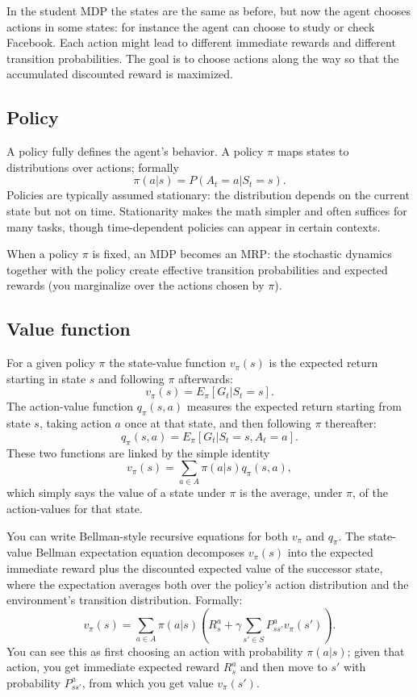 In the student MDP the states are the same as before, but now the agent chooses actions in some states: for instance the agent can choose to study or check Facebook. Each action might lead to different immediate rewards and different transition probabilities. The goal is to choose actions along the way so that the accumulated discounted reward is maximized.

\subsection{Policy}
A policy fully defines the agent’s behavior. A policy $\pi$ maps states to distributions over actions; formally
\begin{equation*}
    \pi(a|s) = P(A_t=a|S_t=s).
\end{equation*}
Policies are typically assumed stationary: the distribution depends on the current state but not on time. Stationarity makes the math simpler and often suffices for many tasks, though time-dependent policies can appear in certain contexts.

When a policy $\pi$ is fixed, an MDP becomes an MRP: the stochastic dynamics together with the policy create effective transition probabilities and expected rewards (you marginalize over the actions chosen by $\pi$).

\subsection{Value function}
For a given policy $\pi$ the state-value function $v_\pi(s)$ is the expected return starting in state $s$ and following $\pi$ afterwards:
\begin{equation*}
    v_\pi(s)=E_\pi[G_t|S_t=s].
\end{equation*}
The action-value function $q_\pi(s,a)$ measures the expected return starting from state $s$, taking action $a$ once at that state, and then following $\pi$ thereafter:
\begin{equation*}
    q_\pi(s,a)=E_\pi[G_t|S_t=s,A_t=a].    
\end{equation*}
These two functions are linked by the simple identity
\begin{equation*}
    v_\pi(s)=\sum_{a\in A}\pi(a|s)q_\pi(s,a),
\end{equation*}
which simply says the value of a state under $\pi$ is the average, under $\pi$, of the action-values for that state.

You can write Bellman-style recursive equations for both $v_\pi$ and $q_\pi$. The state-value Bellman expectation equation decomposes $v_\pi(s)$ into the expected immediate reward plus the discounted expected value of the successor state, where the expectation averages both over the policy’s action distribution and the environment’s transition distribution. Formally:
\begin{equation*}
    v_\pi(s)=\sum_{a \in A} \pi(a|s)\left(R_s^a+\gamma\sum_{s'\in S}P_{ss'}^av_\pi(s')\right).
\end{equation*}
You can see this as first choosing an action with probability $\pi(a|s)$; given that action, you get immediate expected reward $R_s^a$ and then move to $s'$ with probability $P_{ss'}^a$, from which you get value $v_\pi(s')$.

